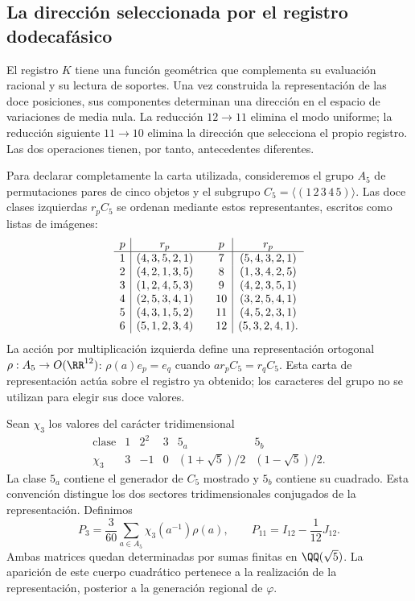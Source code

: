 \subsection{La dirección seleccionada por el registro dodecafásico}
\label{exc:k-direccion}

El registro \(K\) tiene una función geométrica que complementa su
evaluación racional y su lectura de soportes. Una vez construida la
representación de las doce posiciones, sus componentes determinan una
dirección en el espacio de variaciones de media nula. La reducción
\(12\to11\) elimina el modo uniforme; la reducción siguiente
\(11\to10\) elimina la dirección que selecciona el propio registro.
Las dos operaciones tienen, por tanto, antecedentes diferentes.

Para declarar completamente la carta utilizada, consideremos el grupo
\(A_5\) de permutaciones pares de cinco objetos y el subgrupo
\(C_5=\langle(1\,2\,3\,4\,5)\rangle\). Las doce clases izquierdas
\(r_pC_5\) se ordenan mediante estos representantes, escritos como
listas de imágenes:
\[
\begin{array}{c|c@{\qquad}c|c}
p&r_p&p&r_p\\ \hline
1&(4,3,5,2,1)&7&(5,4,3,2,1)\\
2&(4,2,1,3,5)&8&(1,3,4,2,5)\\
3&(1,2,4,5,3)&9&(4,2,3,5,1)\\
4&(2,5,3,4,1)&10&(3,2,5,4,1)\\
5&(4,3,1,5,2)&11&(4,5,2,3,1)\\
6&(5,1,2,3,4)&12&(5,3,2,4,1).
\end{array}
\]
La acción por multiplicación izquierda define una representación
ortogonal \(\rho:A_5\to O(\RR^{12})\):
\(\rho(a)e_p=e_q\) cuando \(ar_pC_5=r_qC_5\).
Esta carta de representación actúa sobre el registro ya obtenido;
los caracteres del grupo no se utilizan para elegir sus doce valores.

Sean \(\chi_3\) los valores del carácter tridimensional
\[
\begin{array}{c|ccccc}
\text{clase}&1&2^2&3&5_a&5_b\\ \hline
\chi_3&3&-1&0&(1+\sqrt5)/2&(1-\sqrt5)/2.
\end{array}
\]
La clase \(5_a\) contiene el generador de \(C_5\) mostrado y
\(5_b\) contiene su cuadrado. Esta convención distingue los dos
sectores tridimensionales conjugados de la representación. Definimos
\begin{equation}
 P_3=\frac3{60}\sum_{a\in A_5}\chi_3(a^{-1})\rho(a),
 \qquad P_{11}=I_{12}-\frac1{12}J_{12}.
 \label{eq:k-proyectores-incidencia}
\end{equation}
Ambas matrices quedan determinadas por sumas finitas en
\(\QQ(\sqrt5)\). La aparición de este cuerpo cuadrático pertenece
a la realización de la representación, posterior a la generación
regional de \(\varphi\).

